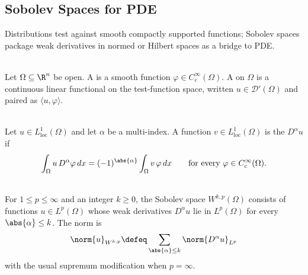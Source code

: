 \subsection{Sobolev Spaces for PDE}

%

Distributions test against smooth compactly supported functions; Sobolev spaces package weak derivatives in normed or Hilbert spaces as a bridge to PDE.

\begin{definition} \label{def:test-functions-and-distributions} \\
Let $\Omega\subseteq\R^n$ be open. A  is a smooth function $\varphi\in C_c^\infty(\Omega)$. A  on $\Omega$ is a continuous linear functional on the test-function space, written $u\in\mathcal{D}'(\Omega)$ and paired as $\langle u,\varphi\rangle$.
\end{definition}


\begin{definition} \label{def:weak-derivative} \\
Let $u\in L_{\mathrm{loc}}^1(\Omega)$ and let $\alpha$ be a multi-index. A function $v\in L_{\mathrm{loc}}^1(\Omega)$ is the  $D^\alpha u$ if
\[
\int_{\Omega}u\,D^\alpha\varphi\,dx
=(-1)^{\abs{\alpha}}\int_{\Omega}v\,\varphi\,dx
\qquad\text{for every }\varphi\in C_c^\infty(\Omega).
\]
\end{definition}

\begin{definition} \label{def:sobolev-space-preview} \\
For $1\leq p\leq\infty$ and an integer $k\geq0$, the Sobolev space $W^{k,p}(\Omega)$ consists of functions $u\in L^p(\Omega)$ whose weak derivatives $D^\alpha u$ lie in $L^p(\Omega)$ for every $\abs{\alpha}\leq k$. The norm is
\[
\norm{u}_{W^{k,p}}\defeq
\sum_{\abs{\alpha}\leq k}\norm{D^\alpha u}_{L^p}
\]
with the usual supremum modification when $p=\infty$.
\end{definition}
